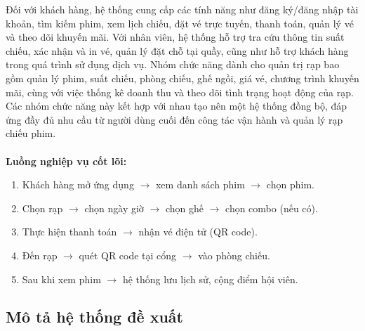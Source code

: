 \documentclass[a4paper]{article}
\newcommand{\cach}{\hspace*{1.5em}\ignorespaces}
\begin{document}
\vspace{0.2cm}

\indent Đối với khách hàng, hệ thống cung cấp các tính năng như đăng ký/đăng nhập tài khoản, tìm kiếm phim, xem lịch chiếu, đặt vé trực tuyến, thanh toán, quản lý vé và theo dõi khuyến mãi. Với nhân viên, hệ thống hỗ trợ tra cứu thông tin suất chiếu, xác nhận và in vé, quản lý đặt chỗ tại quầy, cũng như hỗ trợ khách hàng trong quá trình sử dụng dịch vụ. Nhóm chức năng dành cho quản trị rạp bao gồm quản lý phim, suất chiếu, phòng chiếu, ghế ngồi, giá vé, chương trình khuyến mãi, cùng với việc thống kê doanh thu và theo dõi tình trạng hoạt động của rạp. Các nhóm chức năng này kết hợp với nhau tạo nên một hệ thống đồng bộ, đáp ứng đầy đủ nhu cầu từ người dùng cuối đến công tác vận hành và quản lý rạp chiếu phim.
\\
\\
\cach \textbf{Luồng nghiệp vụ cốt lõi:}
\begin{enumerate}
    \item Khách hàng mở ứng dụng $\rightarrow$ xem danh sách phim $\rightarrow$ chọn phim.
    \item Chọn rạp $\rightarrow$ chọn ngày giờ $\rightarrow$ chọn ghế $\rightarrow$ chọn combo (nếu có).
    \item Thực hiện thanh toán $\rightarrow$ nhận vé điện tử (QR code).
    \item Đến rạp $\rightarrow$ quét QR code tại cổng $\rightarrow$ vào phòng chiếu.
    \item Sau khi xem phim $\rightarrow$ hệ thống lưu lịch sử, cộng điểm hội viên.
\end{enumerate}

\subsection{Mô tả hệ thống đề xuất}
\end{document}
